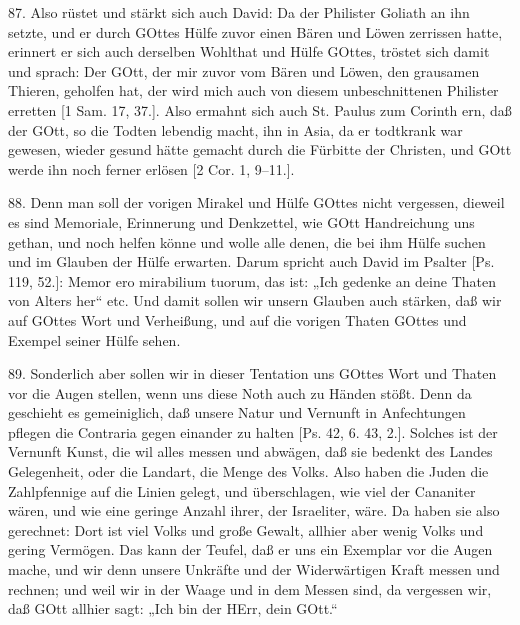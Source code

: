 87. Also rüstet und stärkt sich auch David: Da der Philister Goliath an ihn setzte, und er durch GOttes Hülfe zuvor einen Bären und Löwen zerrissen hatte, erinnert er sich auch derselben Wohlthat und Hülfe GOttes, tröstet sich damit und sprach: Der GOtt, der mir zuvor vom Bären und Löwen, den grausamen Thieren, geholfen hat, der wird mich auch von diesem unbeschnittenen Philister erretten [1 Sam. 17, 37.]. Also ermahnt sich auch St. Paulus zum Corinth ern, daß der GOtt, so die Todten lebendig macht, ihn in Asia, da er todtkrank war gewesen, wieder gesund hätte gemacht durch die Fürbitte der Christen, und GOtt werde ihn noch ferner erlösen [2 Cor. 1, 9–11.].

88. Denn man soll der vorigen Mirakel und Hülfe GOttes nicht vergessen, dieweil es sind
Memoriale, Erinnerung und Denkzettel, wie GOtt Handreichung uns gethan, und noch helfen könne und wolle alle denen, die bei ihm Hülfe suchen und im Glauben der Hülfe erwarten. Darum spricht auch David im Psalter [Ps. 119, 52.]: Memor ero mirabilium tuorum, das ist: „Ich gedenke an deine Thaten von Alters her“ etc. Und damit sollen wir unsern Glauben auch stärken, daß wir auf GOttes Wort und Verheißung, und auf die vorigen Thaten GOttes und Exempel seiner Hülfe sehen.

89. Sonderlich aber sollen wir in dieser Tentation uns GOttes Wort und Thaten vor die Augen stellen, wenn uns diese Noth auch zu Händen stößt. Denn da geschieht es gemeiniglich, daß unsere Natur und Vernunft in Anfechtungen pflegen die Contraria gegen einander zu halten [Ps. 42, 6. 43, 2.]. Solches ist der Vernunft Kunst, die wil alles messen und abwägen, daß sie bedenkt des Landes Gelegenheit, oder die Landart, die Menge des Volks. Also haben die Juden die Zahlpfennige auf die Linien gelegt, und überschlagen, wie viel der Cananiter wären, und wie eine geringe Anzahl ihrer, der Israeliter, wäre. Da haben sie also gerechnet: Dort ist viel Volks und große Gewalt, allhier aber wenig Volks und gering Vermögen. Das kann der Teufel, daß er uns ein Exemplar vor die Augen mache, und wir denn unsere Unkräfte und der Widerwärtigen Kraft messen und rechnen; und weil wir in der Waage und in dem Messen sind, da vergessen wir, daß GOtt allhier sagt: „Ich bin der HErr, dein GOtt.“


